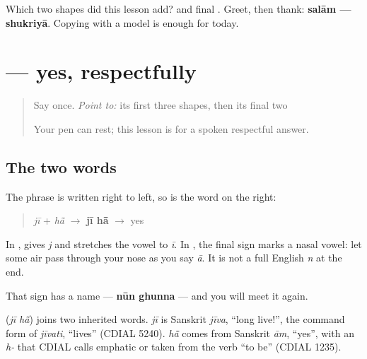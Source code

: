 \begin{tcolorbox}[breakable,colback=teal!4,colframe=teal!35!black,title={Before you move on}]
Which two shapes did this lesson add? \textbf{} and final \textbf{}. Greet, then thank: \textbf{salām — shukriyā}. Copying with a model is enough for today.
\end{tcolorbox}
\section[\texorpdfstring{\ur{جی} \ur{ہاں} (jī hā̃)}{جی ہاں (jī hā̃)}]{  — yes, respectfully}

\label{lesson:UR-C01-ji-han}



\begin{quote}
Say \textbf{} once. \emph{Point to:} its first three shapes, then its final two

Your pen can rest; this lesson is for a spoken respectful answer.
\end{quote}

\subsection*{The two words}
The phrase is written right to left, so \textbf{} is the word on the right:

\begin{quote}
\textbf{} \emph{jī} + \textbf{} \emph{hā̃} $\to$ \textbf{jī hā̃} $\to$ yes
\end{quote}

In \textbf{}, \textbf{} gives \emph{j} and \textbf{} stretches the vowel to \emph{ī}. In \textbf{}, the final sign \textbf{} marks a nasal vowel: let some air pass through your nose as you say \emph{ā}. It is not a full English \emph{n} at the end.

That sign has a name — \textbf{nūn ghunna} — and you will meet it again.

\begin{cousinweb}
\textbf{ } (\emph{jī hā̃}) joins two inherited words. \emph{jī} is Sanskrit \emph{jīva}, \textquotedblleft{}long live!\textquotedblright{}, the command form of \emph{jīvati}, \textquotedblleft{}lives\textquotedblright{} (CDIAL 5240). \emph{hā̃} comes from Sanskrit \emph{ām}, \textquotedblleft{}yes\textquotedblright{}, with an \emph{h-} that CDIAL calls emphatic or taken from the verb \textquotedblleft{}to be\textquotedblright{} (CDIAL 1235).
\end{cousinweb}

